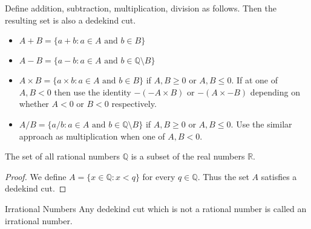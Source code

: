 \begin{prp}{}{} Define addition, subtraction, multiplication, division as follows. Then the resulting set is also a dedekind cut. 
\begin{itemize}
\item $A+B=\{a+b:a\in A\text{ and }b\in B\}$
\item $A-B=\{a-b:a\in A\text{ and }b\in \mathbb{Q}\setminus B\}$
\item $A\times B=\{a\times b:a\in A\text{ and }b\in B\}$ if $A,B\geq 0$ or $A,B\leq 0$. If at one of $A,B<0$ then use the identity $-(-A\times B)$ or $-(A\times -B)$ depending on whether $A<0$ or $B<0$ respectively. 
\item $A/B=\{a/b:a\in A\text{ and }b\in \mathbb{Q}\setminus B\}$ if $A,B\geq 0$ or $A,B\leq 0$. Use the similar approach as multiplication when one of $A,B<0$. 
\end{itemize}
\end{prp}

\begin{prp}{}{} The set of all rational numbers $\mathbb{Q}$ is a subset of the real numbers $\mathbb{R}$. 
\end{prp}
\begin{proof} We define $A=\{x\in\mathbb{Q}:x<q\}$ for every $q\in\mathbb{Q}$. Thus the set $A$ satisfies a dedekind cut. 
\end{proof}

\begin{defn}{Irrational Numbers}{} Any dedekind cut which is not a rational number is called an irrational number. 
\end{defn}

